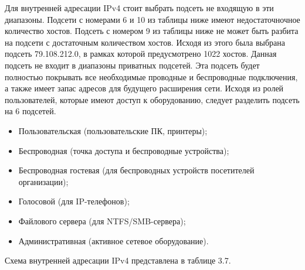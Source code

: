     Для внутренней адресации IPv4 стоит выбрать подсеть не входящую в эти диапазоны.
    Подсети с номерами 6 и 10 из таблицы ниже имеют недостаточночное количество хостов.
    Подсеть с номером 9 из таблицы ниже не может быть разбита на подсети с достаточным количеством хостов.
    Исходя из этого была выбрана подсеть 79.108.212.0, в рамках которой предусмотрено 1022 хостов.
    Данная подсеть не входит в диапазоны приватных подсетей.
    Эта подсеть будет полностью покрывать все необходимые проводные и беспроводные подключения,
    а также имеет запас адресов для будущего расширения сети.
    Исходя из ролей пользователей, которые имеют доступ к оборудованию, следует разделить подсеть на 6 подсетей.

    \begin{itemize}
        \item Пользовательская (пользовательские ПК, принтеры);
        \item Беспроводная (точка доступа и беспроводные устройства);
        \item Беспроводная гостевая (для беспроводных устройств посетителей организации);
        \item Голосовой (для IP-телефонов);
        \item Файлового сервера (для NTFS/SMB-сервера);
        \item Административная (активное сетевое оборудование).
    \end{itemize}

Схема внутренней адресации IPv4 представлена в таблице 3.7.

